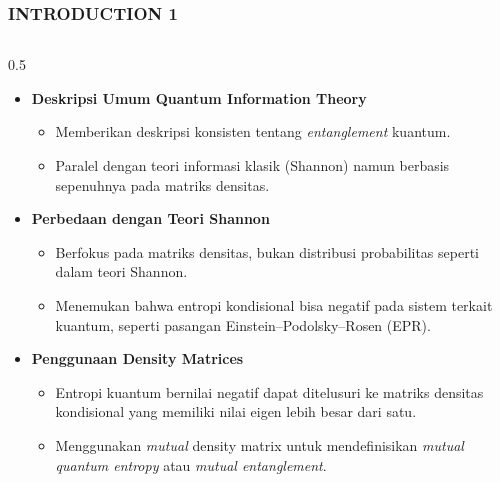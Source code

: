 \begin{frame}
    \frametitle{INTRODUCTION 1}
    \vspace*{-0.5cm}
    \begin{columns}[T]
        \begin{column}{0.5\textwidth}
            \begin{itemize}\tiny\justifying
                \item \textbf{Deskripsi Umum Quantum Information Theory}
                    \begin{itemize}\tiny\justifying
                        \item[$\Rightarrow$] Memberikan deskripsi konsisten tentang
                            \textit{entanglement} kuantum.
                        \item[$\Rightarrow$] Paralel dengan teori informasi klasik
                            (Shannon) namun berbasis sepenuhnya pada matriks densitas.
                    \end{itemize}
                \item \textbf{Perbedaan dengan Teori Shannon}
                    \begin{itemize}\tiny\justifying
                        \item[$\Rightarrow$] Berfokus pada matriks densitas, bukan
                            distribusi probabilitas seperti dalam teori Shannon.
                        \item[$\Rightarrow$] Menemukan bahwa entropi kondisional bisa
                            negatif pada sistem terkait kuantum, seperti pasangan
                            Einstein--Podolsky--Rosen (EPR).
                    \end{itemize}
                \item \textbf{Penggunaan Density Matrices}
                    \begin{itemize}\tiny\justifying
                        \item[$\Rightarrow$] Entropi kuantum bernilai negatif dapat
                            ditelusuri ke matriks densitas kondisional yang memiliki
                            nilai eigen lebih besar dari satu.
                        \item[$\Rightarrow$] Menggunakan \textit{mutual} density matrix
                            untuk mendefinisikan \textit{mutual quantum entropy} atau
                            \textit{mutual entanglement}.
                    \end{itemize}
            \end{itemize}
        \end{column}


\end{columns}
\end{frame}
